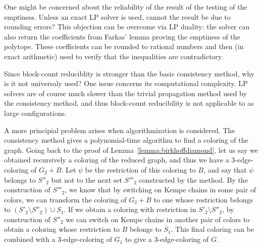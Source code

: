 \documentclass[12pt,twoside,openright,a4paper]{book}
\begin{document}
One might be concerned about the reliability of the result of the testing of the emptiness.  Unless an exact LP solver is used,
cannot the result be due to rounding errors?  This objection can be overcome via LP duality: the solver can also return the coefficients
from Farkas' lemma proving the emptiness of the polytope.  These coefficients can be rounded to rational numbers and then (in exact arithmetic)
used to verify that the inequalities are contradictory.

Since block-count reduciblity is stronger than the basic consistency method, why is it not universaly used?
One issue concerns its computational complexity.  LP solvers are of course much slower than the trivial propagation
method used by the consistency method, and thus block-count reducibility is not applicable to as large configurations.

A more principial problem arises when algorithmization is considered.  The consistency method gives a polynomial-time algorithm
to find a coloring of the graph. Going back to the proof of Lemma~\ref{lemma:birkhoffdiamond}, let us say we obtained recursively
a coloring of the reduced graph, and thus we have a $3$-edge-coloring of $G_2+B$.  Let $\psi$ be the restriction of this coloring to $B$,
and say that $\psi$ belongs to $S''_2$ but not to the next set $S'''_2$ constructed by the method.  By the construction of $S'''_2$,
we know that by switching on Kempe chains in some pair of colors, we can transform the coloring of $G_2+B$ to one whose restriction belongs to
$(S'_2\setminus S''_2)\cup S_1$.  If we obtain a coloring with restriction in $S'_2\setminus S''_2$, by construction of $S''_2$ we can switch
on Kempe chains in another pair of colors to obtain a coloring whose restriction to $B$ belongs to $S_1$.  This final coloring can be combined
with a $3$-edge-coloring of $G_1$ to give a $3$-edge-coloring of $G$.
\end{document}
